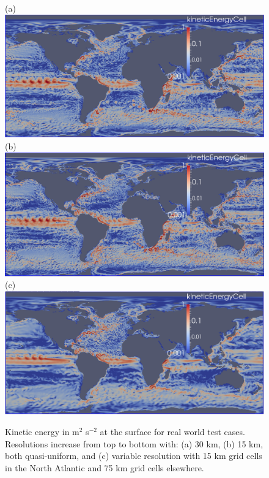 \begin{figure}[H]
	\centering
(a)\includegraphics[scale=0.36]{ocean/figures/m72s_30km_yr11_k1_ke.png}\\
(b)\includegraphics[scale=0.36]{ocean/figures/m72r_15km_yr2_k1_ke.png}\\
(c)\includegraphics[scale=0.36]{ocean/figures/m72t_NA_15km_yr11_k1_ke.png}
\caption{Kinetic energy in m$^2$ s$^{-2}$ at the surface for real world test cases.  Resolutions increase from top to bottom with: (a) 30 km, (b) 15 km, both quasi-uniform, and (c) variable resolution with 15 km grid cells in the North Atlantic and 75 km grid cells elsewhere. }
	\label{fig:real_world_ke2}
\end{figure}

